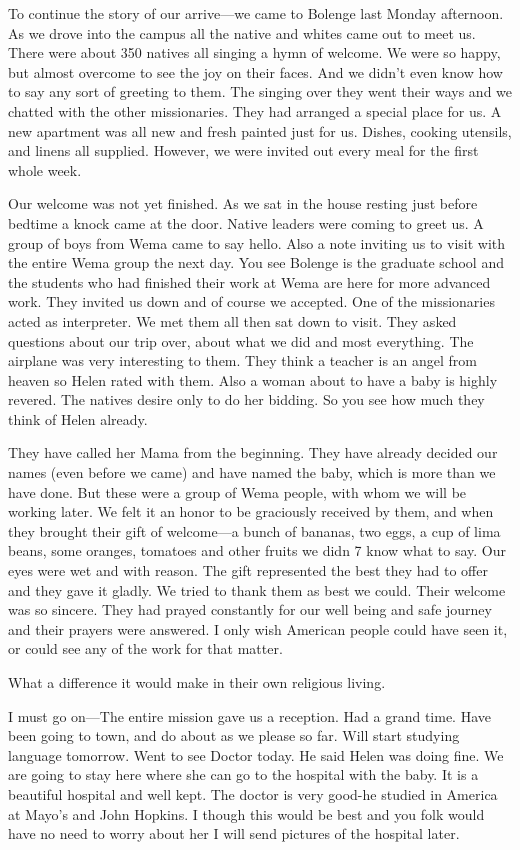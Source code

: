 \documentclass[
]{book}
\begin{document}
To continue the story of our arrive---we came to Bolenge last Monday afternoon. As we drove into the campus all the native and whites came out to meet us. There were about 350 natives all singing a hymn of welcome. We were so happy, but almost overcome to see the joy on their faces. And we didn't even know how to say any sort of greeting to them. The singing over they went their ways and we chatted with the other missionaries. They had arranged a special place for us. A new apartment was all new and fresh painted just for us. Dishes, cooking utensils, and linens all supplied. However, we were invited out every meal for the first whole week.

Our welcome was not yet finished. As we sat in the house resting just before bedtime a knock came at the door. Native leaders were coming to greet us. A group of boys from Wema came to say hello. Also a note inviting us to visit with the entire Wema group the next day. You see Bolenge is the graduate school and the students who had finished their work at Wema are here for more advanced work. They invited us down and of course we accepted. One of the missionaries acted as interpreter. We met them all then sat down to visit. They asked questions about our trip over, about what we did and most everything. The airplane was very interesting to them. They think a teacher is an angel from heaven so Helen rated with them. Also a woman about to have a baby is highly revered. The natives desire only to do her bidding. So you see how much they think of Helen already.

They have called her Mama from the beginning. They have already decided our names (even before we came) and have named the baby, which is more than we have done. But these were a group of Wema people, with whom we will be working later. We felt it an honor to be graciously received by them, and when they brought their gift of welcome---a bunch of bananas, two eggs, a cup of lima beans, some oranges, tomatoes and other fruits we didn 7 know what to say. Our eyes were wet and with reason. The gift represented the best they had to offer and they gave it gladly. We tried to thank them as best we could. Their welcome was so sincere. They had prayed constantly for our well being and safe journey and their prayers were answered. I only wish American people could have seen it, or could see any of the work for that matter.

What a difference it would make in their own religious living.

I must go on---The entire mission gave us a reception. Had a grand time. Have been going to town, and do about as we please so far. Will start studying language tomorrow. Went to see Doctor today. He said Helen was doing fine. We are going to stay here where she can go to the hospital with the baby. It is a beautiful hospital and well kept. The doctor is very good-he studied in America at Mayo's and John Hopkins. I though this would be best and you folk would have no need to worry about her I will send pictures of the hospital later.
\end{document}

